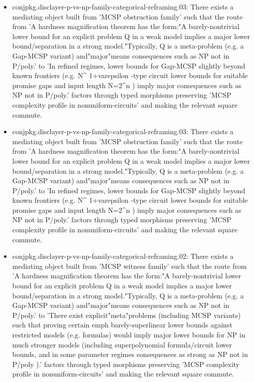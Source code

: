\documentclass[11pt]{article}
\begin{document}
\begin{itemize}
\item conjpkg.disclayer-p-vs-np-family-categorical-reframing.03: There exists a mediating object built from 'MCSP obstruction family' such that the route from 'A hardness magnification theorem has the form:"A barely-nontrivial lower bound for an explicit problem Q in a weak model implies a major lower bound/separation in a strong model."Typically, Q is a meta-problem (e.g. a Gap-MCSP variant) and"major"means consequences such as NP not in P/poly.' to 'In refined regimes, lower bounds for Gap-MCSP slightly beyond known frontiers (e.g. N\textasciicircum{} 1+varepsilon -type circuit lower bounds for suitable promise gaps and input length N=2\textasciicircum{}n ) imply major consequences such as NP not in P/poly.' factors through typed morphisms preserving 'MCSP complexity profile in nonuniform-circuits' and making the relevant square commute.
\item conjpkg.disclayer-p-vs-np-family-categorical-reframing.03: There exists a mediating object built from 'MCSP obstruction family' such that the route from 'A hardness magnification theorem has the form:"A barely-nontrivial lower bound for an explicit problem Q in a weak model implies a major lower bound/separation in a strong model."Typically, Q is a meta-problem (e.g. a Gap-MCSP variant) and"major"means consequences such as NP not in P/poly.' to 'In refined regimes, lower bounds for Gap-MCSP slightly beyond known frontiers (e.g. N\textasciicircum{} 1+varepsilon -type circuit lower bounds for suitable promise gaps and input length N=2\textasciicircum{}n ) imply major consequences such as NP not in P/poly.' factors through typed morphisms preserving 'MCSP complexity profile in nonuniform-circuits' and making the relevant square commute.
\item conjpkg.disclayer-p-vs-np-family-categorical-reframing.02: There exists a mediating object built from 'MCSP witness family' such that the route from 'A hardness magnification theorem has the form:"A barely-nontrivial lower bound for an explicit problem Q in a weak model implies a major lower bound/separation in a strong model."Typically, Q is a meta-problem (e.g. a Gap-MCSP variant) and"major"means consequences such as NP not in P/poly.' to 'There exist explicit"meta"problems (including MCSP variants) such that proving certain emph barely-superlinear lower bounds against restricted models (e.g. formulas) would imply major lower bounds for NP in much stronger models (including superpolynomial formula/circuit lower bounds, and in some parameter regimes consequences as strong as NP not in P/poly ).' factors through typed morphisms preserving 'MCSP complexity profile in nonuniform-circuits' and making the relevant square commute.

\end{itemize}
\end{document}
